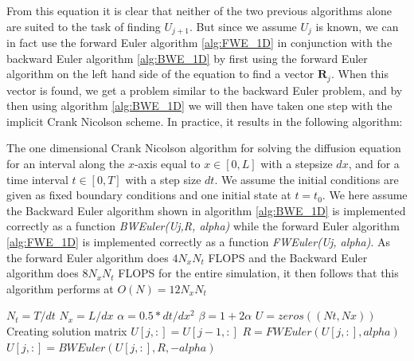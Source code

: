 \documentclass[a4paper,10pt,english]{article}
\renewcommand{\vec}[1]{\mathbf{#1}}
\begin{document}
From this equation it is clear that neither of the two previous algorithms alone are suited to the task of finding $U_{j+1}$. But since we assume $U_{j}$ is known, we can in fact use the forward Euler algorithm \ref{alg:FWE_1D} in conjunction with the backward Euler algorithm \ref{alg:BWE_1D} by first using the forward Euler algorithm on the left hand side of the equation to find a vector $\vec{R}_j$. When this vector is found, we get a problem similar to the backward Euler problem, and by then using algorithm \ref{alg:BWE_1D} we will then have taken one step with the implicit Crank Nicolson scheme. In practice, it results in the following algorithm:

\begin{algorithm}[H]
\centering
\caption{The one dimensional Crank Nicolson algorithm for solving the diffusion equation for an interval along the $x$-axis equal to $x \in [0,L]$ with a stepsize $dx$, and for a time interval $t \in [0,T]$ with a step size $dt$. We assume the initial conditions are given as fixed boundary conditions and one initial state at $t=t_0$. We here assume the Backward Euler algorithm shown in algorithm \ref{alg:BWE_1D} is implemented correctly as a function  \textit{BWEuler(Uj,R, alpha)} while the forward Euler algorithm \ref{alg:FWE_1D} is implemented correctly as a function \textit{FWEuler(Uj, alpha)}. As the forward Euler algorithm does $4N_xN_t$ \textsc{FLOPS} and the Backward Euler algorithm does $8N_x N_t$ \textsc{FLOPS} for the entire simulation, it then follows that this algorithm performs at $O(N) = 12N_xN_t$  \label{alg:CN_1D}}
	\begin{algorithmic}[1]
		\State $N_t = T/dt$
		\State $N_x = L/dx$
		\State $\alpha = 0.5*dt/dx^2$
		\State $\beta = 1 + 2\alpha$
		\State $U = zeros((Nt,Nx))$
		\Comment Creating solution matrix
			\State $U[j,:] = U[j-1,:]$
			\State $R = FWEuler(U[j,:],alpha)$ 
			\State $U[j,:] = BWEuler(U[j,:],R,-alpha)$
		\EndFor
	\end{algorithmic}
\end{algorithm}
\end{document}

